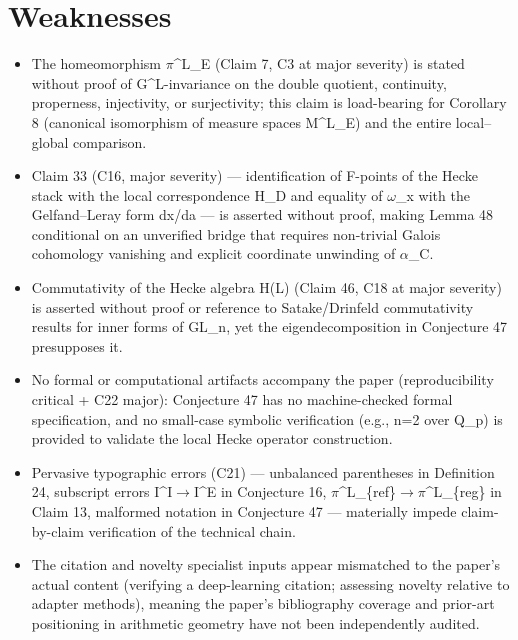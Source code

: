 \documentclass[11pt]{article}
\begin{document}
\section*{Weaknesses}
\begin{itemize}[leftmargin=*]
  \item The homeomorphism \ensuremath{\pi}\^{}L\_E (Claim 7, C3 at major severity) is stated without proof of G\^{}L-invariance on the double quotient, continuity, properness, injectivity, or surjectivity; this claim is load-bearing for Corollary 8 (canonical isomorphism of measure spaces M\^{}L\_E) and the entire local--global comparison.
  \item Claim 33 (C16, major severity) --- identification of F-points of the Hecke stack with the local correspondence H\_D and equality of \ensuremath{\omega}\_x with the Gelfand--Leray form dx/da --- is asserted without proof, making Lemma 48 conditional on an unverified bridge that requires non-trivial Galois cohomology vanishing and explicit coordinate unwinding of \ensuremath{\alpha}\_C.
  \item Commutativity of the Hecke algebra H(L) (Claim 46, C18 at major severity) is asserted without proof or reference to Satake/Drinfeld commutativity results for inner forms of GL\_n, yet the eigendecomposition in Conjecture 47 presupposes it.
  \item No formal or computational artifacts accompany the paper (reproducibility critical + C22 major): Conjecture 47 has no machine-checked formal specification, and no small-case symbolic verification (e.g., n=2 over Q\_p) is provided to validate the local Hecke operator construction.
  \item Pervasive typographic errors (C21) --- unbalanced parentheses in Definition 24, subscript errors I\^{}I\ensuremath{\to}I\^{}E in Conjecture 16, \ensuremath{\pi}\^{}L\_\{ref\}\ensuremath{\to}\ensuremath{\pi}\^{}L\_\{reg\} in Claim 13, malformed notation in Conjecture 47 --- materially impede claim-by-claim verification of the technical chain.
  \item The citation and novelty specialist inputs appear mismatched to the paper's actual content (verifying a deep-learning citation; assessing novelty relative to adapter methods), meaning the paper's bibliography coverage and prior-art positioning in arithmetic geometry have not been independently audited.
\end{itemize}
\end{document}
